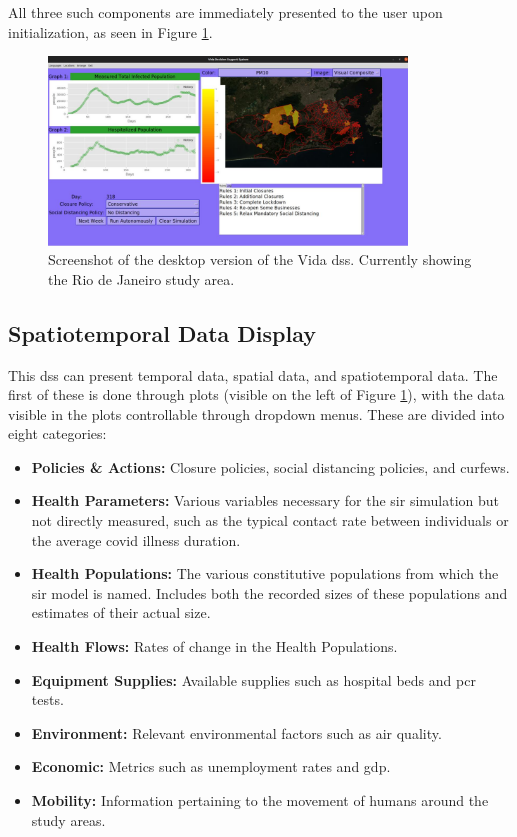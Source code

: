 All three such components are immediately presented to the user upon initialization, as seen in Figure \ref{fig:vidad}.

\begin{figure}[!htb]
\centering
\includegraphics[width=0.85\textwidth]{Figures/chap5/VidaDesktopScreenshot.jpg}
\caption[Desktop Vida DSS Screenshot]{Screenshot of the desktop version of the Vida \ac{dss}. Currently showing the Rio de Janeiro study area.}
\label{fig:vidad}
\end{figure}


\subsection{Spatiotemporal Data Display}

This \ac{dss} can present temporal data, spatial data, and spatiotemporal data. The first of these is done through plots (visible on the left of Figure \ref{fig:vidad}), with the data visible in the plots controllable through dropdown menus. These are divided into eight categories:

\begin{itemize}[itemsep=0pt,parsep=0pt]
	\item{\textbf{Policies \& Actions:} Closure policies, social distancing policies, and curfews.}
	\item{\textbf{Health Parameters:} Various variables necessary for the \ac{sir} simulation but not directly measured, such as the typical contact rate between individuals or the average \ac{covid} illness duration.}
	\item{\textbf{Health Populations:} The various constitutive populations from which the \acl{sir} model is named. Includes both the recorded sizes of these populations and estimates of their actual size.}
	\item{\textbf{Health Flows:} Rates of change in the Health Populations.}
	\item{\textbf{Equipment Supplies:} Available supplies such as hospital beds and \ac{pcr} tests.}
	\item{\textbf{Environment:} Relevant environmental factors such as air quality.}
	\item{\textbf{Economic:} Metrics such as unemployment rates and \ac{gdp}.}
	\item{\textbf{Mobility:} Information pertaining to the movement of humans around the study areas.} 
\end{itemize}

